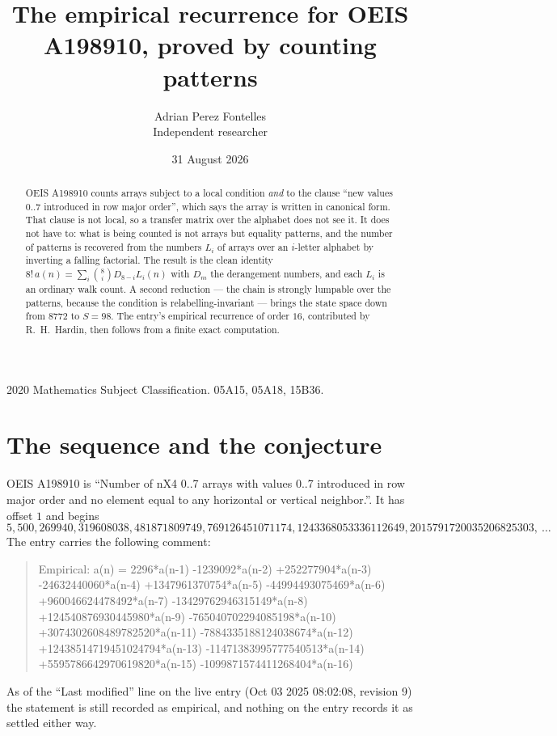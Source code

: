 \documentclass[11pt,a4paper]{article}
\title{The empirical recurrence for OEIS A198910, proved by counting patterns}
\author{Adrian Perez Fontelles\\ \small Independent researcher}
\date{31 August 2026}
\theoremstyle{plain}
\theoremstyle{definition}
\begin{document}
\maketitle

\begin{abstract}
OEIS A198910 counts arrays subject to a local condition \emph{and} to the clause ``new values
$0..7$ introduced in row major order'', which says the array is written in canonical
form. That clause is not local, so a transfer matrix over the alphabet does not see it. It
does not have to: what is being counted is not arrays but equality patterns, and the number
of patterns is recovered from the numbers $L_i$ of arrays over an $i$-letter alphabet by
inverting a falling factorial. The result is the clean identity
$8!\,a(n)=\sum_i\binom{8}{i}D_{8-i}L_i(n)$ with $D_m$ the derangement numbers,
and each $L_i$ is an ordinary walk count. A second reduction --- the chain is strongly
lumpable over the patterns, because the condition is relabelling-invariant --- brings the
state space down from $8772$ to $S=98$. The entry's empirical recurrence of order
$16$, contributed by R.~H.~Hardin, then follows from a finite exact computation.
\end{abstract}

\noindent\small 2020 Mathematics Subject Classification. 05A15, 05A18, 15B36.\normalsize

\section{The sequence and the conjecture}

OEIS A198910 is ``Number of nX4 0..7 arrays with values 0..7 introduced in row major order and no element equal to any horizontal or vertical neighbor.''. It has offset $1$ and begins
\[
5, 500, 269940, 319608038, 481871809749, 769126451071174, 1243368053336112649, 2015791720035206825303,\ \dots
\]
The entry carries the following comment:
\begin{quote}\small
Empirical: a(n) = 2296*a(n-1) -1239092*a(n-2) +252277904*a(n-3) -24632440060*a(n-4) +1347961370754*a(n-5) -44994493075469*a(n-6) +960046624478492*a(n-7) -13429762946315149*a(n-8) +124540876930445980*a(n-9) -765040702294085198*a(n-10) +3074302608489782520*a(n-11) -7884335188124038674*a(n-12) +12438514719451024794*a(n-13) -11471383995777540513*a(n-14) +5595786642970619820*a(n-15) -1099871574411268404*a(n-16)
\end{quote}
As of the ``Last modified'' line on the live entry (Oct 03 2025 08:02:08, revision 9) the statement is
still recorded as empirical, and nothing on the entry records it as settled either way.
\end{document}
